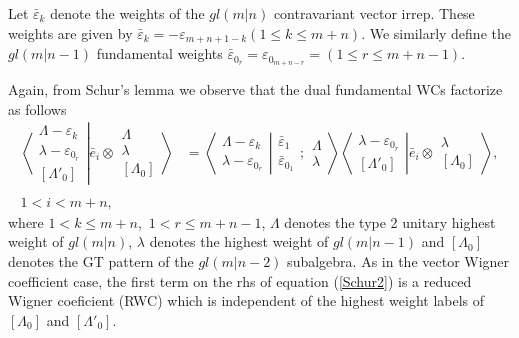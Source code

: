 \documentclass[12pt]{article}
\def\nn{\nonumber}
\begin{document}
Let $\bar{\varepsilon}_k$ denote the weights of the $gl(m|n)$ contravariant vector irrep. These weights are given by $\bar{\varepsilon}_k = -\varepsilon_{m+n+1-k} (1 \leq k \leq m+n)$. We similarly define the $gl(m|n-1)$ fundamental weights $\bar{\varepsilon}_{0_r} =
\varepsilon_{0_{m+n-r}} = (1 \leq r \leq m+n-1) $.

Again, from Schur's lemma we observe that the dual fundamental WCs factorize as follows
\begin{align}
\left\langle\left. 
\begin{array}{c} \Lambda-\varepsilon_k\\ \lambda-\varepsilon_{0_r} \\ {[\Lambda'_0]} \end{array}
\right|\right.
\left.
\bar{e}_i\otimes \begin{array}{c} \Lambda \\ \lambda \\
{[\Lambda_0]} \end{array}
\right\rangle &= 
\left\langle\left. 
\begin{array}{c} \Lambda-\varepsilon_k\\ \lambda-\varepsilon_{0_r} 
 \end{array}
\right|\right.
\left.
\begin{array}{c} \bar{\varepsilon}_1 \\ \bar{\varepsilon}_{0_1} 
 \end{array}
; \begin{array}{c} \Lambda \\ \lambda
 \end{array}
\right\rangle 
\left\langle\left. 
\begin{array}{c} \lambda-\varepsilon_{0_r} \\ {[\Lambda'_0]} \end{array}
\right|\right.
\left.
\bar{e}_i\otimes \begin{array}{c} \lambda \\
{[\Lambda_0]} \end{array}
\right\rangle,\label{Schur2}\\
~~\nn\\
1 < i < m+n, \nn
\end{align}
where $1 < k \leq m+n$,~$1 < r \leq m+n-1$, 
$\Lambda$ denotes the type 2 unitary highest weight of $gl(m|n)$, $\lambda$ denotes the highest weight of $gl(m|n-1)$ and $[\Lambda_0]$ denotes the GT pattern of the $gl(m|n-2)$ subalgebra. As in the vector Wigner coefficient case, the first term on the rhs of equation (\ref{Schur2}) is a reduced Wigner coeficient (RWC) which is independent of the highest
weight labels of $[\Lambda_0]$ and $[\Lambda'_0]$.
\end{document}
